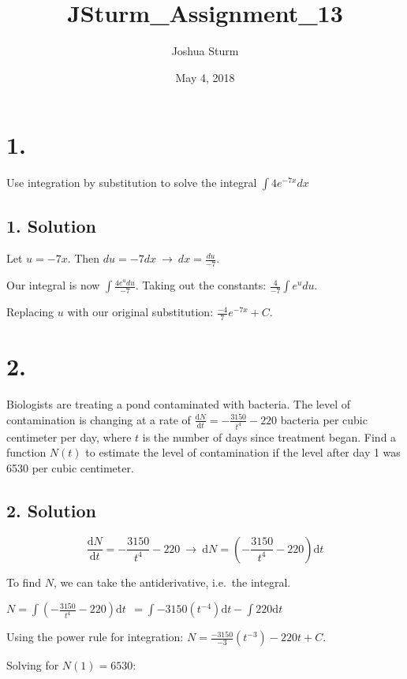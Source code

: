 \documentclass[]{article}
\title{JSturm\_Assignment\_13}
\author{Joshua Sturm}
\date{May 4, 2018}
\begin{document}
\maketitle

\section{1.}\label{section}

Use integration by substitution to solve the integral
\(\int 4e^{-7x}dx\)

\subsection{1. Solution}\label{solution}

Let \(u = -7x\). Then \(du = -7 dx \ \to \ dx = \frac{du}{-7}\).

Our integral is now \(\int \frac{4e^{u}du}{-7}\). Taking out the
constants: \(\frac{4}{-7}\int e^u du\).

Replacing \(u\) with our original substitution:
\(\frac{-4}{7}e^{-7x} + C\).

\section{2.}\label{section-1}

Biologists are treating a pond contaminated with bacteria. The level of
contamination is changing at a rate of
\(\frac{\text{d}N}{\text{d}t} = -\frac{3150}{t^4} - 220\) bacteria per
cubic centimeter per day, where \(t\) is the number of days since
treatment began. Find a function \(N(t)\) to estimate the level of
contamination if the level after day 1 was 6530 per cubic centimeter.

\subsection{2. Solution}\label{solution-1}

\[
\frac{\text{d}N}{\text{d}t} = -\frac{3150}{t^4} - 220 \ \to \ \text{d}N = (-\frac{3150}{t^4}-220)\text{d}t
\]

To find \(N\), we can take the antiderivative, i.e.~the integral.

\(N = \int (-\frac{3150}{t^4}-220)\text{d}t \ \ = \int -3150(t^{-4}) \text{d}t - \int 220\text{d}t\)

Using the power rule for integration:
\(N = \frac{-3150}{-3}(t^{-3}) - 220t + C\).

Solving for \(N(1) = 6530\):
\end{document}

